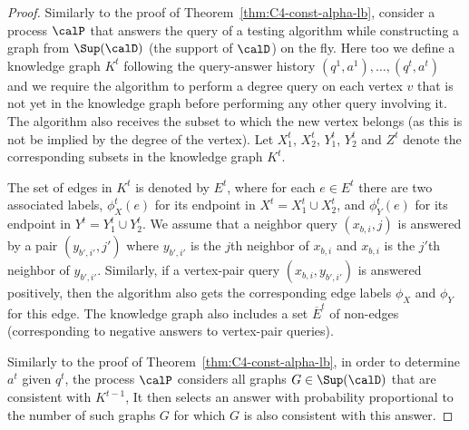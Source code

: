 \begin{proof}
Similarly to the proof of Theorem~\ref{thm:C4-const-alpha-lb}, consider a process $\calP$ that answers the query of a testing algorithm while constructing a graph from $\Sup(\calD)$ (the support of $\calD$) on the fly. Here too we define a knowledge graph $K^t$ following the query-answer history $(q^1,a^1),\dots,(q^t,a^t)$ and we require the algorithm to perform a degree query on each vertex $v$ that is not yet in the knowledge graph before performing any other query involving it. The algorithm also receives the subset to which the new vertex belongs (as this is not be implied by the degree of the vertex). Let $X_1^t$, $X_2^t$, $Y_1^t$, $Y_2^t$ and $Z^t$ denote the corresponding subsets in the knowledge graph $K^t$. %

The set of edges in $K^t$ is denoted by $E^t$, where for each $e\in E^t$ there are two associated labels, 
$\phi^t_X(e)$ for its endpoint in $X^t = X_1^t \cup X_2^t$, and $\phi^t_Y(e)$ for its endpoint in $Y^t = Y_1^t \cup Y_2^t$.
 We assume that a neighbor query $(x_{b,i},j)$ is answered by a pair $(y_{b',i'},j')$ where
$y_{b',i'}$ is the $j$th neighbor of $x_{b,i}$ and $x_{b,i}$ is the $j'$th neighbor of $y_{b',i'}$. Similarly, if a vertex-pair query $(x_{b,i},y_{b',i'})$ is answered positively, then the algorithm also gets the corresponding edge labels $\phi_X$ and $\phi_Y$ for this edge. The knowledge graph also includes a set $\overline{E}^t$ of non-edges (corresponding to negative answers to vertex-pair queries).

Similarly to 
the proof of Theorem~\ref{thm:C4-const-alpha-lb}, in order to
determine $a^t$ given $q^t$,
the process $\calP$ considers all graphs  $G\in \Sup(\calD)$ 
that are consistent with $K^{t-1}$, 
It then selects an answer with probability proportional to the number of such graphs $G$ for which %
$G$ is also consistent with this answer. 


\end{proof}

